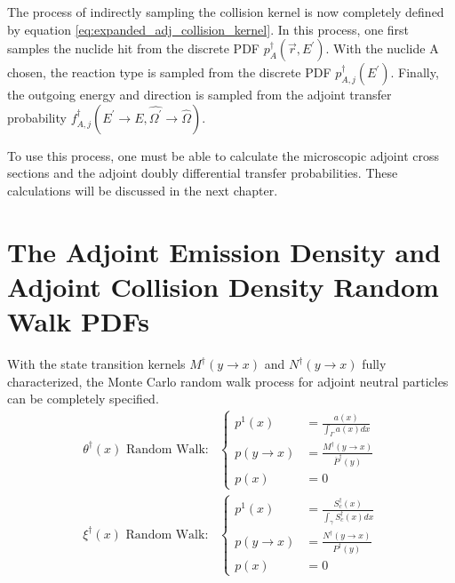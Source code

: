 The process of indirectly sampling the collision kernel is now completely 
defined by equation \ref{eq:expanded_adj_collision_kernel}. In this process,
one first samples the nuclide hit from the discrete PDF 
$p_A^{\dagger}(\vec{r},E^{'})$. With the nuclide A chosen, the reaction type is
sampled from the discrete PDF $p_{A,j}^{\dagger}(E^{'})$. Finally, the outgoing
energy and direction is sampled from the adjoint transfer probability
$f_{A,j}^{\dagger}(E^{'} \to E,\hat{\Omega^{'}} \to \hat{\Omega})$. 

To use this process, one must be able to calculate the microscopic adjoint
cross sections and the adjoint doubly differential transfer probabilities. 
These calculations will be discussed in the next chapter. 

\section{The Adjoint Emission Density and Adjoint Collision Density Random Walk PDFs}
With the state transition kernels $M^{\dagger}(y \to x)$ and 
$N^{\dagger}(y \to x)$ fully characterized, the Monte Carlo random walk process
for adjoint neutral particles can be completely specified. 
\begin{align}
  \theta^{\dagger}(x)\text{ Random Walk:}&
  \begin{cases}
    p^1(x) & = \frac{a(x)}{\int_{\Gamma} a(x)dx} \\
    p(y \to x) & = \frac{M^{\dagger}(y \to x)}{\overline{P}^{\dagger}(y)} \\
    p(x) & = 0
  \end{cases}
  \label{eq:mc_random_walk_adj_emission_dens} \\
  \xi^{\dagger}(x)\text{ Random Walk:}&
  \begin{cases}
    p^1(x) & = \frac{S_c^{\dagger}(x)}{\int_{\gamma} S_c^{\dagger}(x)dx} \\
    p(y \to x) & = \frac{N^{\dagger}(y \to x)}{P^{\dagger}(y)} \\
    p(x) & = 0
  \end{cases}
  \label{eq:mc_random_walk_adj_collision_dens}
\end{align}

